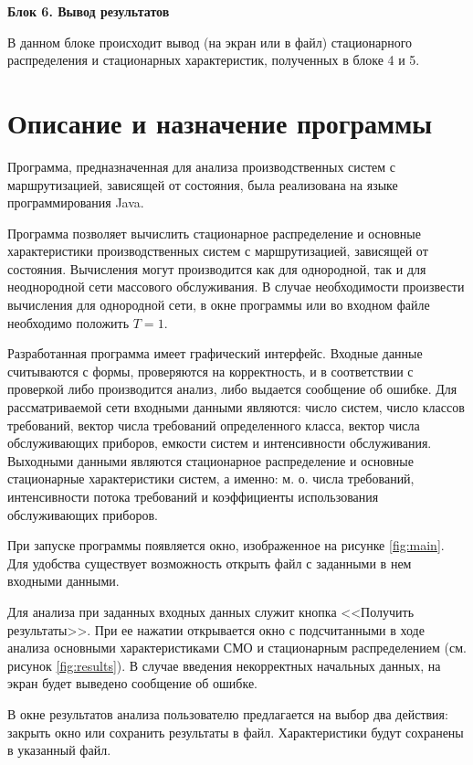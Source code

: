 \documentclass[a4paper,14pt]{extarticle}
\theoremstyle{note}
\begin{document}
\medskip
\textbf{Блок 6. Вывод результатов}

В данном блоке происходит вывод (на экран или в файл) стационарного распределения и стационарных характеристик, полученных в блоке 4 и 5.




\section{Описание и назначение программы}
\label{sec:program_description_and_purpose}

Программа, предназначенная для  анализа производственных систем с маршрутизацией, зависящей от состояния, была реализована на языке программирования Java.

Программа позволяет вычислить стационарное распределение и основные характеристики производственных систем с маршрутизацией, зависящей от состояния. Вычисления могут производится как для однородной, так и для неоднородной сети массового обслуживания. В случае необходимости произвести вычисления для однородной сети, в окне программы или во входном файле необходимо положить $T=1$.

Разработанная программа имеет графический интерфейс. Входные данные считываются с формы, проверяются на корректность, и в соответствии с проверкой либо производится анализ, либо выдается сообщение об ошибке. Для рассматриваемой сети входными данными являются: число систем, число классов требований, вектор числа требований определенного класса, вектор числа обслуживающих приборов, емкости систем и интенсивности обслуживания. Выходными данными являются стационарное распределение и основные стационарные характеристики систем, а именно: м. о. числа требований, интенсивности потока требований и коэффициенты использования обслуживающих приборов.

При запуске программы появляется окно, изображенное на рисунке \ref{fig:main}. Для удобства существует возможность открыть файл с заданными в нем входными данными.

Для анализа при заданных входных данных служит кнопка <<Получить результаты>>. При ее нажатии открывается окно с подсчитанными в ходе анализа основными характеристиками СМО и стационарным распределением (см. рисунок \ref{fig:results}). В случае введения некорректных начальных данных, на экран будет выведено сообщение об ошибке.

В окне результатов анализа пользователю предлагается на выбор два действия: закрыть окно или сохранить результаты в файл. Характеристики будут сохранены в указанный файл.
\end{document}
